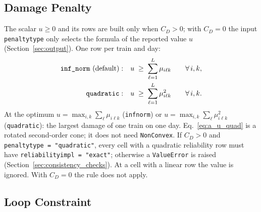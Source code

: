 \documentclass[11pt,a4paper]{article}
\theoremstyle{plain}
\theoremstyle{definition}
\renewcommand{\_}{\textunderscore\allowbreak{}}
\begin{document}
\subsection{Damage Penalty}
\label{sec:damage_reg}

The scalar $u \geq 0$ and its rows are built only when $C_D > 0$; with $C_D = 0$ the
input \texttt{penalty\_type} only selects the formula of the reported value $u$
(Section~\ref{sec:output}). One row per train and day:
\begin{align}
  \texttt{inf\_norm} \text{ (default)}:&\quad
    u \;\geq\; \sum_{\ell=1}^{L} \mu_{i\ell k} \qquad \forall\, i, k,
    \label{eq:a_u_inf} \\
  \texttt{quadratic}:&\quad
    u \;\geq\; \sum_{\ell=1}^{L} \mu_{i\ell k}^2 \qquad \forall\, i, k.
    \label{eq:a_u_quad}
\end{align}
At the optimum $u = \max_{i,k} \sum_{\ell} \mu_{i\ell k}$ (\texttt{inf\_norm}) or
$u = \max_{i,k} \sum_{\ell} \mu_{i\ell k}^2$ (\texttt{quadratic}): the largest damage of
one train on one day. Eq.~\eqref{eq:a_u_quad} is a rotated second-order cone; it does
not need \texttt{NonConvex}. If $C_D > 0$ and \texttt{penalty\_type = "quadratic"}, every cell
with a quadratic reliability row must have \texttt{reliability\_impl = "exact"};
otherwise a \texttt{ValueError} is raised (Section~\ref{sec:consistency_checks}). At a
cell with a linear row the value is ignored. With $C_D = 0$ the rule does not apply.

\subsection{Loop Constraint}
\label{sec:loop}
\end{document}
